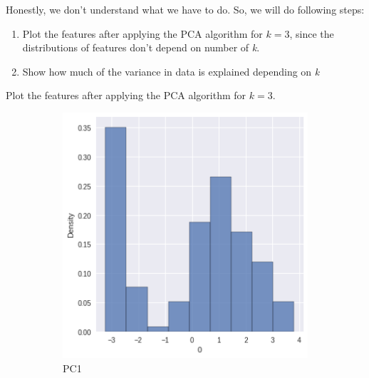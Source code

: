 \documentclass{homework}
\begin{document}
Honestly, we don't understand what we have to do. So, we will do following steps:
\begin{enumerate}
	\item Plot the features after applying the PCA algorithm for $k=3$, since the distributions of features don't depend on number of \emph{k}.
	\item Show how much of the variance in data is explained depending on \emph{k}
\end{enumerate}
Plot the features after applying the PCA algorithm for $k=3$.
\newpage
\begin{figure}[hbt!]
     \centering
     \begin{subfigure}[b]{0.3\textwidth}
         \centering
         \includegraphics[width=\textwidth]{PC1_distribution.png}
         \caption{PC1}
     \end{subfigure}
     \hfill
     \begin{subfigure}[b]{0.3\textwidth}
         \centering

\end{subfigure}
\end{figure}
\end{document}
